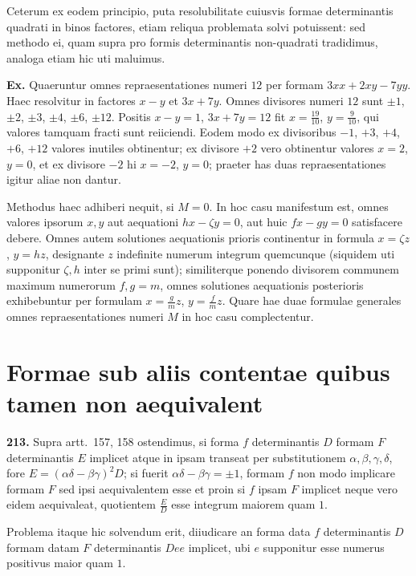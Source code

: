 \documentclass[12pt,a4paper]{article}
\theoremstyle{plain}
\theoremstyle{definition}
\theoremstyle{remark}
\begin{document}
Ceterum ex eodem principio, puta resolubilitate cuiusvis formae determinantis quadrati in binos factores, etiam reliqua problemata solvi potuissent: sed methodo ei, quam supra pro formis determinantis non-quadrati tradidimus, analoga etiam hic uti maluimus.

\textbf{Ex.} Quaeruntur omnes repraesentationes numeri $12$ per formam $3xx+2xy-7yy$. Haec resolvitur in factores $x-y$ et $3x+7y$. Omnes divisores numeri $12$ sunt $\pm1$, $\pm2$, $\pm3$, $\pm4$, $\pm6$, $\pm12$. Positis $x-y=1$, $3x+7y=12$ fit $x=\frac{19}{10}$, $y=\frac{9}{10}$, qui valores tamquam fracti sunt reiiciendi. Eodem modo ex divisoribus $-1$, $+3$, $+4$, $+6$, $+12$ valores inutiles obtinentur; ex divisore $+2$ vero obtinentur valores $x=2$, $y=0$, et ex divisore $-2$ hi $x=-2$, $y=0$; praeter has duas repraesentationes igitur aliae non dantur.

Methodus haec adhiberi nequit, si $M=0$. In hoc casu manifestum est, omnes valores ipsorum $x,y$ aut aequationi $hx-\zeta y=0$, aut huic $fx-gy=0$ satisfacere debere. Omnes autem solutiones aequationis prioris continentur in formula $x=\zeta z$, $y=hz$, designante $z$ indefinite numerum integrum quemcunque (siquidem uti supponitur $\zeta,h$ inter se primi sunt); similiterque ponendo divisorem communem maximum numerorum $f,g=m$, omnes solutiones aequationis posterioris exhibebuntur per formulam $x=\frac{g}{m}z$, $y=\frac{f}{m}z$. Quare hae duae formulae generales omnes repraesentationes numeri $M$ in hoc casu complectentur.



\section*{Formae sub aliis contentae quibus tamen non aequivalent}

\textbf{213.}
Supra artt.~157, 158 ostendimus, si forma $f$ determinantis $D$ formam $F$ determinantis $E$ implicet atque in ipsam transeat per substitutionem $\alpha,\beta,\gamma,\delta$, fore $E=(\alpha\delta-\beta\gamma)^2D$; si fuerit $\alpha\delta-\beta\gamma=\pm1$, formam $f$ non modo implicare formam $F$ sed ipsi aequivalentem esse et proin si $f$ ipsam $F$ implicet neque vero eidem aequivaleat, quotientem $\frac{E}{D}$ esse integrum maiorem quam $1$.

Problema itaque hic solvendum erit, diiudicare an forma data $f$ determinantis $D$ formam datam $F$ determinantis $Dee$ implicet, ubi $e$ supponitur esse numerus positivus maior quam $1$.
\end{document}
